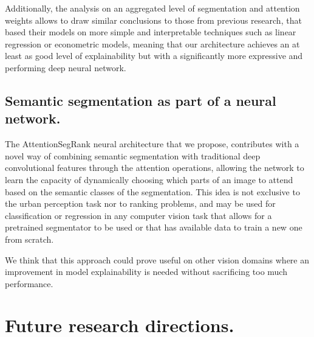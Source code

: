 Additionally, the analysis on an aggregated level of segmentation and attention weights
allows to draw similar conclusions to those from previous research, that based their models
on more simple and interpretable techniques such as linear regression or econometric models,
meaning that our architecture achieves an at least as good level of explainability
but with a significantly more expressive and performing deep neural network.

\subsection{Semantic segmentation as part of a neural network.}
The AttentionSegRank neural architecture that we propose, contributes with a novel way of combining
semantic segmentation with traditional deep convolutional features through the attention operations,
allowing the network to learn the capacity of dynamically choosing which parts of an image to attend
based on the semantic classes of the segmentation. This idea is not exclusive to the urban perception task
nor to ranking problems, and may be used for classification or regression in any computer vision task
that allows for a pretrained segmentator to be used or that has available data to train a new one from
scratch.

We think that this approach could prove useful on other vision domains where an improvement
in model explainability is needed without sacrificing too much performance.

\section{Future research directions.}

